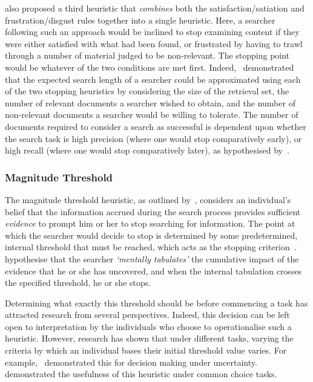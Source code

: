\cite{kraft1979stopping_rules} also proposed a third heuristic that \emph{combines} both the satisfaction/satiation and frustration/disgust rules together into a single heuristic. Here, a searcher following such an approach would be inclined to stop examining content if they were either satisfied with what had been found, or frustrated by having to trawl through a number of material judged to be non-relevant. The stopping point would be whatever of the two conditions are met first. Indeed,~\cite{kraft1979stopping_rules} demonstrated that the expected search length of a searcher could be approximated using each of the two stopping heuristics by considering the size of the retrieval set, the number of relevant documents a searcher wished to obtain, and the number of non-relevant documents a searcher would be willing to tolerate. The number of documents required to consider a search as successful is dependent upon whether the search task is high precision (where one would stop comparatively early), or high recall (where one would stop comparatively later), as hypothesised by~\cite{bates1984thirty_items}.

\subsubsection{Magnitude Threshold}\label{sec:stopping_background:heuristics:judgement:magnitude}
The magnitude threshold heuristic, as outlined by~\citep{nickles1995judgment}, considers an individual's belief that the information accrued during the search process provides sufficient \emph{evidence} to prompt him or her to stop searching for information. The point at which the searcher would decide to stop is determined by some predetermined, internal threshold that must be reached, which acts as the stopping criterion~\citep{wald1948sequential_analysis, nickles1995judgment}.~\cite{gettys1979hypothesis} hypothesise that the searcher \emph{`mentally tabulates'} the cumulative impact of the evidence that he or she has uncovered, and when the internal tabulation crosses the specified threshold, he or she stops.

Determining what exactly this threshold should be before commencing a task has attracted research from several perspectives. Indeed, this decision can be left open to interpretation by the individuals who choose to operationalise such a heuristic. However, research has shown that under different tasks, varying the criteria by which an individual bases their initial threshold value varies. For example,~\cite{busemeyer1982choice_behaviour} demonstrated this for decision making under uncertainty.~\cite{saad1996stopping} demonstrated the usefulness of this heuristic under common choice tasks.

